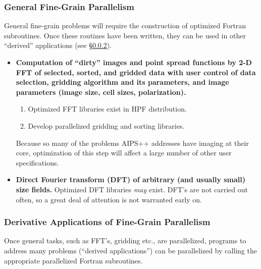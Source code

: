 \subsubsection{General Fine-Grain Parallelism}

General fine-grain problems will require the construction of optimized
Fortran subroutines.  Once these routines have been written, they can
be used in other ``derived'' applications (see \S \ref{derived2}).

\begin{itemize}

\item {\bf Computation of ``dirty'' images and point spread functions
by 2-D FFT of selected, sorted, and gridded data with user control of
data selection, gridding algorithm and its parameters, and image
parameters (image size, cell sizes, polarization).}  

\begin{enumerate}

\item Optimized FFT libraries exist in HPF distribution.  

\item Develop parallelized gridding and sorting libraries.

\end{enumerate}

Because so many of the problems AIPS++ addresses have imaging at their
core, optimization of this step will affect a large number of other
user specifications.

\item {\bf Direct Fourier transform (DFT) of arbitrary (and usually
small) size fields.}  Optimized DFT libraries {\it may} exist.  DFT's
are not carried out often, so a great deal of attention is not
warranted early on.

\end{itemize}

\subsubsection{Derivative Applications of Fine-Grain Parallelism}

\label{derived2}

Once general tasks, such as FFT's, gridding etc., are parallelized,
programs to address many problems (``derived applications'') can be
parallelized by calling the appropriate parallelized Fortran
subroutines.

